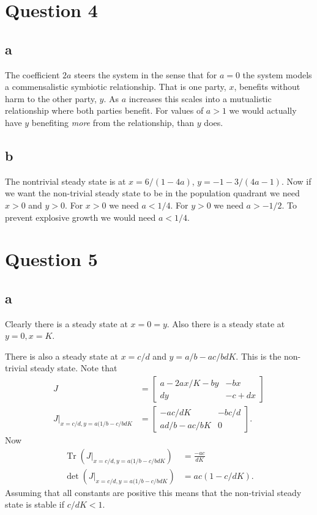 \documentclass{unswmaths}
\begin{document}
\section*{Question 4}
\subsection*{a}
The coefficient $ 2a $ steers the system in the sense that for $ a = 0 $ the system models a commensalistic symbiotic relationship. That is one party, $ x $, benefits without harm to the other party, $ y $. 
As $ a $ increases this scales into a mutualistic relationship where both parties benefit. For values of $ a > 1 $ we would actually have $ y $ benefiting \emph{more} from the relationship, than $ y $ does. 
\subsection*{b}
The nontrivial steady state is at $ x = 6 / (1 - 4a) $, $ y = -1 - 3 / (4a - 1) $. Now if we want the non-trivial steady state to be in the population quadrant we need $ x > 0 $ and $ y > 0 $.
    For $ x > 0 $ we need $ a < 1 / 4 $. For $ y > 0 $ we need  $ a > -1/2 $.  To prevent explosive growth we would need $ a < 1/4 $.


\section*{Question 5}
\subsection*{a}
Clearly there is a steady state at $ x=0=y $.  Also there is a steady state at $ y = 0, x = K $. 

There is also a steady state at $ x = c / d $ and $ y = a / b - ac / bdK $. 
This is the non-trivial steady state.
Note that
\begin{align*}
    J &= \left[ \begin{array}{cc} a - 2a x / K - by & -bx \\ dy & -c + dx \end{array}\right] \\
    J \big|_{x = c/d, y = a(1/b - c/bdK} &= \left[ \begin{array}{cc} -ac / dK & -bc / d \\ ad / b - ac /bK & 0 \end{array} \right].
\end{align*}
Now 
\begin{align*}
    \operatorname{Tr}\left( J \big|_{x = c/d, y = a(1/b - c/bdK} \right) &= \frac{-ac}{dK}  \\
    \operatorname{det}\left(  J \big|_{x = c/d, y = a(1/b - c/bdK} \right) &= ac\left( 1 - c / dK \right).
\end{align*}
Assuming that all constants are positive this means that the non-trivial steady state is stable if $ c/dK < 1 $. 
\end{document}
